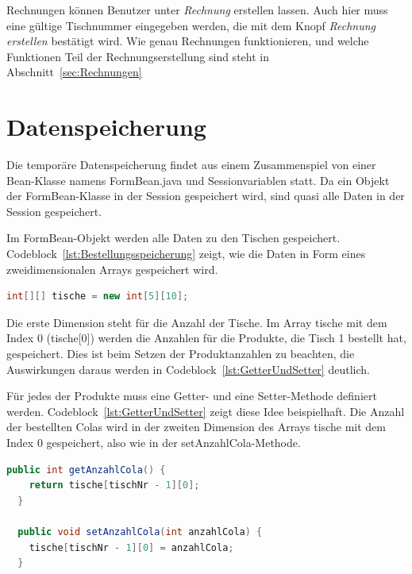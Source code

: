 Rechnungen können Benutzer unter \textit{Rechnung} erstellen lassen.
Auch hier muss eine gültige Tischnummer eingegeben werden, die mit dem Knopf \textit{Rechnung erstellen} bestätigt wird.
Wie genau Rechnungen funktionieren, und welche Funktionen Teil der Rechnungserstellung sind steht in Abschnitt~\ref{sec:Rechnungen}


\section{Datenspeicherung} %
\label{sec:Datenspeicherung}

Die temporäre Datenspeicherung findet aus einem Zusammenspiel von einer Bean-Klasse namens FormBean.java und Sessionvariablen statt.
Da ein Objekt der FormBean-Klasse in der Session gespeichert wird, sind quasi alle Daten in der Session gespeichert.

Im FormBean-Objekt werden alle Daten zu den Tischen gespeichert.
Codeblock~\ref{lst:Bestellungsspeicherung} zeigt, wie die Daten in Form eines zweidimensionalen Arrays gespeichert wird.

\begin{lstlisting}[language=java, caption=Bestellungsspeicherung, label=lst:Bestellungsspeicherung]
  int[][] tische = new int[5][10];
\end{lstlisting}

Die erste Dimension steht für die Anzahl der Tische.
Im Array tische mit dem Index 0 (tische[0]) werden die Anzahlen für die Produkte, die Tisch 1 bestellt hat, gespeichert.
Dies ist beim Setzen der Produktanzahlen zu beachten, die Auswirkungen daraus werden in Codeblock~\ref{lst:GetterUndSetter} deutlich.

Für jedes der Produkte muss eine Getter- und eine Setter-Methode definiert werden.
Codeblock~\ref{lst:GetterUndSetter} zeigt diese Idee beispielhaft.
Die Anzahl der bestellten Colas wird in der zweiten Dimension des Arrays tische mit dem Index 0 gespeichert, also wie in der setAnzahlCola-Methode.

\begin{lstlisting}[language=java, caption=Beispiel für Getter- und Setter-Methoden, label=lst:GetterUndSetter]
  public int getAnzahlCola() {
    return tische[tischNr - 1][0];
  }

  public void setAnzahlCola(int anzahlCola) {
    tische[tischNr - 1][0] = anzahlCola;
  }
\end{lstlisting}

